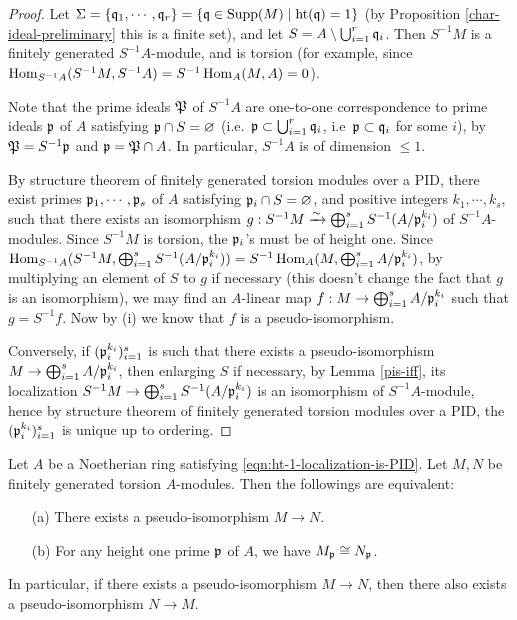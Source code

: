 \begin{proof}
Let
$\Sigma=\{{\mathfrak{q}}_1,\cdots,{\mathfrak{q}}_r\}=\{{\mathfrak{q}}\in{\mathrm{Supp}}(M)\mid{\mathrm{ht}}({\mathfrak{q}})=1\}$
(by Proposition \ref{char-ideal-preliminary} this is a finite set),
and let $S=A\setminus\bigcup_{i=1}^r{\mathfrak{q}}_i$.
Then $S^{-1}M$ is a finitely generated $S^{-1}A$-module,
and is torsion (for example, since $\operatorname{Hom}_{S^{-1}A}(S^{-1}M,S^{-1}A)
=S^{-1}\operatorname{Hom}_A(M,A)=0$).

Note that the prime ideals ${\mathfrak{P}}$ of $S^{-1}A$ are one-to-one correspondence
to prime ideals ${\mathfrak{p}}$ of $A$ satisfying ${\mathfrak{p}}\cap S=\varnothing$
(i.e.~${\mathfrak{p}}\subset\bigcup_{i=1}^r{\mathfrak{q}}_i$, i.e~${\mathfrak{p}}\subset{\mathfrak{q}}_i$ for some $i$),
by ${\mathfrak{P}}=S^{-1}{\mathfrak{p}}$ and ${\mathfrak{p}}={\mathfrak{P}}\cap A$.
In particular, $S^{-1}A$ is of dimension $\leq 1$.

By structure theorem of finitely generated torsion modules over a PID,
there exist primes ${\mathfrak{p}}_1,\cdots,{\mathfrak{p}}_s$ of $A$
satisfying ${\mathfrak{p}}_i\cap S=\varnothing$,
and positive integers $k_1,\cdots,k_s$, such that
there exists an isomorphism
$g:S^{-1}M\xrightarrow\sim\bigoplus_{i=1}^sS^{-1}(A/{\mathfrak{p}}_i^{k_i})$
of $S^{-1}A$-modules.
Since $S^{-1}M$ is torsion, the ${\mathfrak{p}}_i$'s must be of height one.
Since $\operatorname{Hom}_{S^{-1}A}(S^{-1}M,\bigoplus_{i=1}^sS^{-1}(A/{\mathfrak{p}}_i^{k_i}))
=S^{-1}\operatorname{Hom}_A(M,\bigoplus_{i=1}^sA/{\mathfrak{p}}_i^{k_i})$,
by multiplying an element of $S$ to $g$ if necessary
(this doesn't change the fact that $g$ is an isomorphism), we may find
an $A$-linear map $f:M\to\bigoplus_{i=1}^sA/{\mathfrak{p}}_i^{k_i}$
such that $g=S^{-1}f$.
Now by (i) we know that $f$ is a pseudo-isomorphism.

Conversely, if $({\mathfrak{p}}_i^{k_i})_{i=1}^s$ is such that there exists a
pseudo-isomorphism
$M\to\bigoplus_{i=1}^s A/{\mathfrak{p}}_i^{k_i}$,
then enlarging $S$ if necessary, by Lemma \ref{pis-iff},
its localization
$S^{-1}M\to\bigoplus_{i=1}^sS^{-1}(A/{\mathfrak{p}}_i^{k_i})$
is an isomorphism of $S^{-1}A$-module, hence by
structure theorem of finitely generated torsion modules over a PID,
the $({\mathfrak{p}}_i^{k_i})_{i=1}^s$ is unique up to ordering.
\end{proof}

\begin{prop}
\label{pis-symm}
Let $A$ be a Noetherian ring satisfying \eqref{eqn:ht-1-localization-is-PID}.
Let $M,N$ be finitely generated torsion $A$-modules.
Then the followings are equivalent:
\begin{itemize}
\item[(a)]
There exists a pseudo-isomorphism $M\to N$.
\item[(b)]
For any height one prime ${\mathfrak{p}}$ of $A$, we have $M_{\mathfrak{p}}\cong N_{\mathfrak{p}}$.
\end{itemize}
In particular, if there exists a pseudo-isomorphism $M\to N$,
then there also exists a pseudo-isomorphism $N\to M$.
\end{prop}

